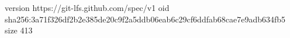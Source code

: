 version https://git-lfs.github.com/spec/v1
oid sha256:3a71f326df2b2e385de20c9f2a5ddb06eab6c29cf6ddfab68cae7e9adb634fb5
size 413
